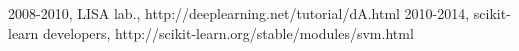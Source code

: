 \begin{thebibliography}{9}
   2008-2010, LISA lab., http://deeplearning.net/tutorial/dA.html
   2010-2014, scikit-learn developers, http://scikit-learn.org/stable/modules/svm.html
\end{thebibliography}
